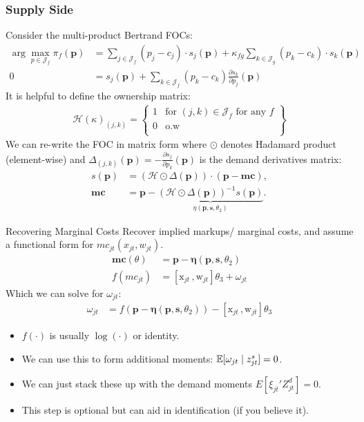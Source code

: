 \begin{frame}[plain]
\frametitle{Supply Side}
Consider the multi-product Bertrand FOCs:
\footnotesize
{\begin{align*}
\arg \max_{p \in \mathcal{J}_f} \pi_f (\mathbf{p}) &= \sum_{j \in \mathcal{J}_f} (p_j - c_j) \cdot s_j(\mathbf{p}) +  \kappa_{fg}\sum_{k \in \mathcal{J}_g} (p_k - c_k) \cdot s_k(\mathbf{p}) \\
0&= s_j(\mathbf{p}) + \sum_{k \in \mathcal{J}_f} (p_k - c_k) \frac{\partial s_{k}}{\partial p_j}(\mathbf{p}) 
\end{align*}
}
It is helpful to define the \alert{ownership matrix}:
\begin{align*}
\mathcal{H}(\kappa)_{(j,k)} = \left\{\begin{array}{lr}
          1 & \text{for }  (j,k) \in \mathcal{J}_f \text{ for any } f \\ 
      0 & \text{o.w}\\
        \end{array} \right\}
\end{align*}
We can re-write the FOC in matrix form where $\odot$ denotes Hadamard product (element-wise) and  $\Delta_{(j,k)}(\mathbf{p})  = - \frac{\partial s_{j}}{\partial p_k}(\mathbf{p})$ is the demand derivatives matrix:
\begin{align*}
        s(\mathbf{p}) &= (\mathcal{H} \odot \Delta(\mathbf{p})) \cdot (\mathbf{p} - \mathbf{mc}), \\
       \mathbf{mc} &=  \mathbf{p} - \underbrace{(\mathcal{H} \odot \Delta(\mathbf{p}))^{-1} s(\mathbf{p})}_{\eta(\mathbf{p},\mathbf{s},\theta_2)}.
\end{align*}
\end{frame}



\begin{frame}{Recovering Marginal Costs }
Recover implied markups/ marginal costs, and assume a functional form for $mc_{jt}(x_{jt},w_{jt})$.
\begin{align*}
\mathbf{mc}(\theta)&= \mathbf{p}- \boldsymbol{\eta}(\mathbf{p},\mathbf{s},\theta_2)\\
f(mc_{jt}) &= [\textrm{x}_{jt} \,, \textrm{w}_{jt}] \theta_3 + \omega_{jt}
\end{align*}
Which we can solve for $\omega_{jt}$:
\begin{align*}
\omega_{jt} &=  f(\mathbf{p}- \boldsymbol{\eta}(\mathbf{p},\mathbf{s},\theta_2) ) -[\textrm{x}_{jt} \,, \textrm{w}_{jt}] \theta_3 
\end{align*}
\begin{itemize}
\item $f(\cdot)$ is usually $\log(\cdot)$ or identity.
\item We can use this to form additional moments: $\mathbb{E}[\omega_{jt} \mid  z_{jt}^{s}]=0$.
\item We can just stack these up with the demand moments $E[\xi_{jt}' Z_{jt}^d]=0$.
\item This step is optional but can aid in identification (if you believe it).
\end{itemize}
\end{frame}


